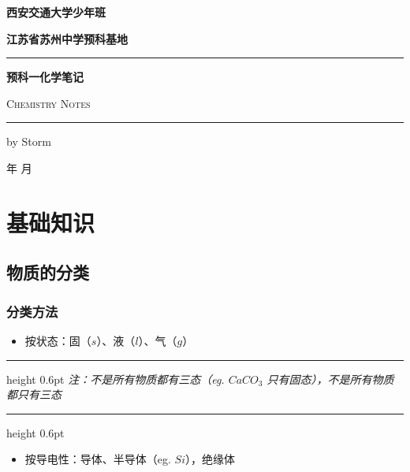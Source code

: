 \documentclass[UTF8,zihao=-4,openany]{ctexbook}
\newcommand{\coverdate}{\number\year 年 \number\month 月}
\newenvironment{notebox}
  {\par\smallskip\noindent\begingroup\begin{minipage}{\linewidth}\color{noteframe}\hrule height 0.6pt\smallskip\color{black}\itshape}
  {\par\smallskip\color{noteframe}\hrule height 0.6pt\end{minipage}\endgroup\par\smallskip}
\begin{document}
\frontmatter
\begin{titlepage}
\centering
\vspace*{1.55cm}
{\songti\bfseries 西安交通大学少年班\par}
\vspace{0.55cm}
{\songti\bfseries 江苏省苏州中学预科基地\par}
\vspace{1.05cm}
\rule{0.72\linewidth}{1.2pt}\par
\vspace{0.95cm}
{\fontsize{42}{52}\selectfont\songti\bfseries 预科一化学笔记\par}
\vspace{0.65cm}
{\rmfamily\scshape Chemistry Notes\par}
\vspace{0.95cm}
\rule{0.72\linewidth}{1.2pt}\par
\vfill
{ by Storm\par}
\vspace{0.75cm}
{ \coverdate\par}
\vspace*{1.5cm}
\end{titlepage}

\pagestyle{plain}
\tableofcontents
\cleardoublepage
\pagestyle{headings}
\mainmatter



\chapter{基础知识}
\section{物质的分类}
\subsection{分类方法}
\begin{itemize}
\item 按状态：固（$s$）、液（$l$）、气（$g$）
\end{itemize}
\begin{notebox}
注：不是所有物质都有三态（eg. $CaCO_3$ 只有固态），不是所有物质都只有三态\par
\end{notebox}
\begin{itemize}
\item 按导电性：导体、半导体（eg. $Si$），绝缘体
\end{itemize}
\end{document}
